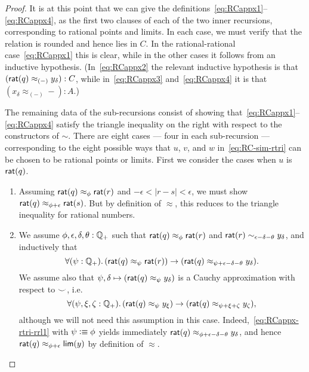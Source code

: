 \begin{proof}
  It is at this point that we can give the definitions~\eqref{eq:RCappx1}--\eqref{eq:RCappx4}, as the first two clauses of each of the two inner recursions, corresponding to rational points and limits.
  In each case, we must verify that the relation is rounded and hence lies in $C$.
  In the rational-rational case~\eqref{eq:RCappx1} this is clear, while in the other cases it follows from an inductive hypothesis.
  (In~\eqref{eq:RCappx2} the relevant inductive hypothesis is that $(\mathsf{rat}(q) \approx_{(-)} y_\delta) : C$, while in~\eqref{eq:RCappx3} and~\eqref{eq:RCappx4} it is that $(x_\delta \approx_{(-)} -) : A$.)

  The remaining data of the sub-recursions consist of showing that~\eqref{eq:RCappx1}--\eqref{eq:RCappx4} satisfy the triangle inequality on the right with respect to the constructors of $\sim$.
  There are eight cases --- four in each sub-recursion --- corresponding to the eight possible ways that $u$, $v$, and $w$ in~\eqref{eq:RC-sim-rtri} can be chosen to be rational points or limits.
  First we consider the cases when $u$ is $\mathsf{rat}(q)$.
  \begin{enumerate}
  \item Assuming $\mathsf{rat}(q)\approx_\phi \mathsf{rat}(r)$ and $-\epsilon<|r-s|<\epsilon$, we must show $\mathsf{rat}(q)\approx_{\phi+\epsilon} \mathsf{rat}(s)$.
    But by definition of $\approx$, this reduces to the triangle inequality for rational numbers.
  \item We assume $\phi,\epsilon,\delta,\theta:\mathbb{Q}_{+}$ such that $\mathsf{rat}(q)\approx_\phi \mathsf{rat}(r)$ and $\mathsf{rat}(r) \sim_{\epsilon-\delta-\theta} y_\delta$, and inductively that
    \begin{equation}
      \fall{\psi:\Qp}(\rcrat(q) \approx_{\psi} \rcrat(r)) \to (\rcrat(q) \approx_{\psi+\epsilon-\delta-\theta} y_\delta).\label{eq:RCappx-rtri-rrl1}
    \end{equation}
    We assume also that $\psi,\delta\mapsto (\mathsf{rat}(q) \approx_{\psi} y_\delta)$ is a Cauchy approximation with respect to $\smile$, i.e.\
    \begin{equation}
      \fall{\psi,\xi,\zeta:\Qp} (\rcrat(q) \approx_{\psi} y_\xi) \to (\rcrat(q) \approx_{\psi+\xi+\zeta} y_\zeta),\label{eq:RCappx-rtri-rrl2}
    \end{equation}
    although we will not need this assumption in this case.
    Indeed,~\eqref{eq:RCappx-rtri-rrl1} with $\psi\vcentcolon\equiv \phi$ yields immediately $\mathsf{rat}(q) \approx_{\phi+\epsilon-\delta-\theta} y_\delta$, and hence $\mathsf{rat}(q) \approx_{\phi+\epsilon} \mathsf{lim}(y)$ by definition of $\approx$.

\end{enumerate}
\end{proof}

